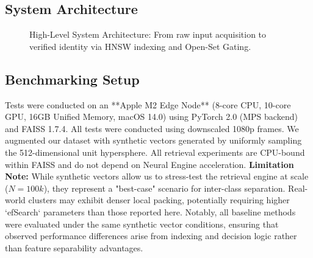 \documentclass[conference]{IEEEtran}
\begin{document}
\subsection{System Architecture}

\begin{figure}[htbp]
\centering
{}

\caption{ High-Level System Architecture: From raw input acquisition to verified identity via HNSW indexing and Open-Set Gating.}
\label{fig:arch}
\end{figure}

\subsection{Benchmarking Setup}
Tests were conducted on an **Apple M2 Edge Node** (8-core CPU, 10-core GPU, 16GB Unified Memory, macOS 14.0) using PyTorch 2.0 (MPS backend) and FAISS 1.7.4. All tests were conducted using downscaled 1080p frames. We augmented our dataset with synthetic vectors generated by uniformly sampling the 512-dimensional unit hypersphere. All retrieval experiments are CPU-bound within FAISS and do not depend on Neural Engine acceleration.
\textbf{Limitation Note:} While synthetic vectors allow us to stress-test the retrieval engine at scale ($N=100k$), they represent a "best-case" scenario for inter-class separation. Real-world clusters may exhibit denser local packing, potentially requiring higher `efSearch` parameters than those reported here. Notably, all baseline methods were evaluated under the same synthetic vector conditions, ensuring that observed performance differences arise from indexing and decision logic rather than feature separability advantages.
\end{document}
